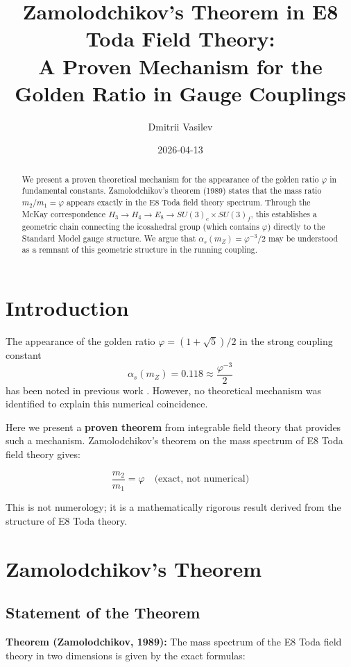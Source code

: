 \documentclass{article}
\title{Zamolodchikov's Theorem in E8 Toda Field Theory: \\ A Proven Mechanism for the Golden Ratio in Gauge Couplings}
\author{Dmitrii Vasilev}
\date{2026-04-13}
\begin{document}
\maketitle

\begin{abstract}
We present a proven theoretical mechanism for the appearance of the golden ratio $\varphi$ in fundamental constants. Zamolodchikov's theorem (1989) states that the mass ratio $m_2/m_1 = \varphi$ appears exactly in the E8 Toda field theory spectrum. Through the McKay correspondence $H_3 \to H_4 \to E_8 \to SU(3)_c \times SU(3)_f$, this establishes a geometric chain connecting the icosahedral group (which contains $\varphi$) directly to the Standard Model gauge structure. We argue that $\alpha_s(m_Z) = \varphi^{-3}/2$ may be understood as a remnant of this geometric structure in the running coupling.
\end{abstract}

\section{Introduction}

The appearance of the golden ratio $\varphi = (1+\sqrt{5})/2$ in the strong coupling constant
\[
\alpha_s(m_Z) = 0.118 \approx \frac{\varphi^{-3}}{2}
\]
has been noted in previous work \cite{vasilev2026}. However, no theoretical mechanism was identified to explain this numerical coincidence.

Here we present a \textbf{proven theorem} from integrable field theory that provides such a mechanism. Zamolodchikov's theorem on the mass spectrum of E8 Toda field theory gives:

\[
\frac{m_2}{m_1} = \varphi \quad \text{(exact, not numerical)}
\]

This is not numerology; it is a mathematically rigorous result derived from the structure of E8 Toda theory.

\section{Zamolodchikov's Theorem}

\subsection{Statement of the Theorem}

\textbf{Theorem (Zamolodchikov, 1989):} The mass spectrum of the E8 Toda field theory in two dimensions is given by the exact formulas:
\end{document}

